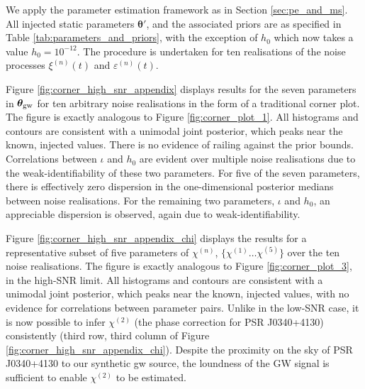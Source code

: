\documentclass[fleqn,usenatbib,useAMS]{mnras}
\begin{document}
We apply the parameter estimation framework as in Section \ref{sec:pe_and_ms}. All injected static parameters $\boldsymbol{\theta}'$, and the associated priors are as specified in Table \ref{tab:parameters_and_priors}, with the exception of $h_0$ which now takes a value $h_0 = 10^{-12}$. The procedure is undertaken for ten realisations of the noise processes $\xi^{(n)}(t)$ and $\varepsilon^{(n)}(t)$. \newline 


Figure \ref{fig:corner_high_snr_appendix} displays results for the seven parameters in $\boldsymbol{\theta}_{\rm gw}$ for ten arbitrary noise realisations in the form of a traditional corner plot. The figure is exactly analogous to Figure \ref{fig:corner_plot_1}. All histograms and contours are consistent with a unimodal joint posterior, which peaks near the known, injected values. There is no evidence of railing against the prior bounds. Correlations between $\iota$ and $h_0$ are evident over multiple noise realisations due to the weak-identifiability of these two parameters. For five of the seven parameters, there is effectively zero dispersion in the one-dimensional posterior medians between noise realisations. For the remaining two parameters, $\iota$ and $h_0$, an appreciable dispersion is observed, again due to weak-identifiability. \newline 


Figure \ref{fig:corner_high_snr_appendix_chi} displays the results for a representative subset of five parameters of $\chi^{(n)}$, $\{\chi^{(1)} \dots \chi^{(5)} \}$ over the ten noise realisations. The figure is exactly analogous to Figure \ref{fig:corner_plot_3}, in the high-SNR limit. All histograms and contours are consistent with a unimodal joint posterior, which peaks near the known, injected values, with no evidence for correlations between parameter pairs. Unlike in the low-SNR case, it is now possible to infer $\chi^{(2)}$ (the phase correction for PSR J0340+4130) consistently (third row, third column of Figure \ref{fig:corner_high_snr_appendix_chi}). Despite the proximity on the sky of PSR J0340+4130 to our synthetic gw source, the loundness of the GW signal is sufficient to enable $\chi^{(2)}$ to be estimated.
\end{document}
